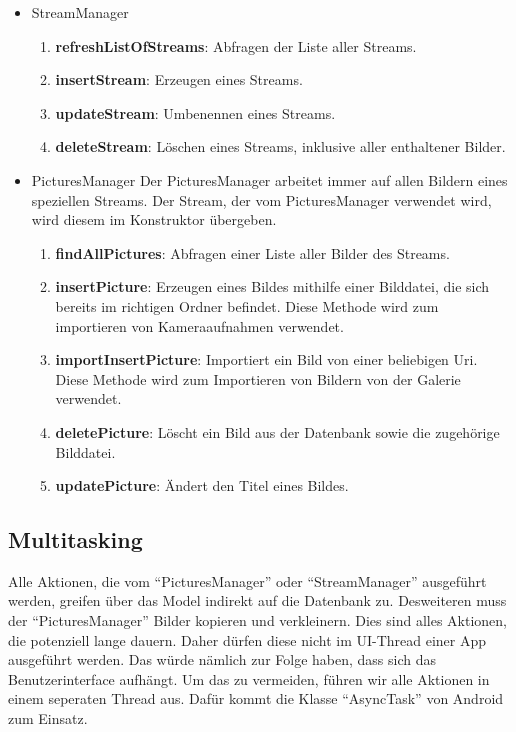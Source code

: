 \begin{itemize}
\item{StreamManager}
\begin{enumerate}
\item \textbf{refreshListOfStreams}: Abfragen der Liste aller Streams.
\item \textbf{insertStream}: Erzeugen eines Streams.
\item \textbf{updateStream}: Umbenennen eines Streams.
\item \textbf{deleteStream}: Löschen eines Streams, inklusive aller enthaltener Bilder.
\end{enumerate}
\item{PicturesManager} \newline
Der PicturesManager arbeitet immer auf allen Bildern eines speziellen Streams. Der Stream, der vom PicturesManager verwendet wird, wird diesem im Konstruktor übergeben.
\begin{enumerate}
\item \textbf{findAllPictures}: Abfragen einer Liste aller Bilder des Streams.
\item \textbf{insertPicture}: Erzeugen eines Bildes mithilfe einer Bilddatei, die sich bereits im richtigen Ordner befindet. Diese Methode wird zum importieren von Kameraaufnahmen verwendet.
\item \textbf{importInsertPicture}: Importiert ein Bild von einer beliebigen Uri. Diese Methode wird zum Importieren von Bildern von der Galerie verwendet.
\item \textbf{deletePicture}: Löscht ein Bild aus der Datenbank sowie die zugehörige Bilddatei.
\item \textbf{updatePicture}: Ändert den Titel eines Bildes.
\end{enumerate}
\end{itemize}

\subsection{Multitasking}

Alle Aktionen, die vom \enquote{PicturesManager} oder \enquote{StreamManager} ausgeführt werden, greifen über das Model indirekt auf die Datenbank zu. Desweiteren muss der \enquote{PicturesManager} Bilder kopieren und verkleinern. Dies sind alles Aktionen, die potenziell lange dauern. Daher dürfen diese nicht im UI-Thread einer App ausgeführt werden. Das würde nämlich zur Folge haben, dass sich das Benutzerinterface aufhängt. Um das zu vermeiden, führen wir alle Aktionen in einem seperaten Thread aus. Dafür kommt die Klasse \enquote{AsyncTask} von Android zum Einsatz.

